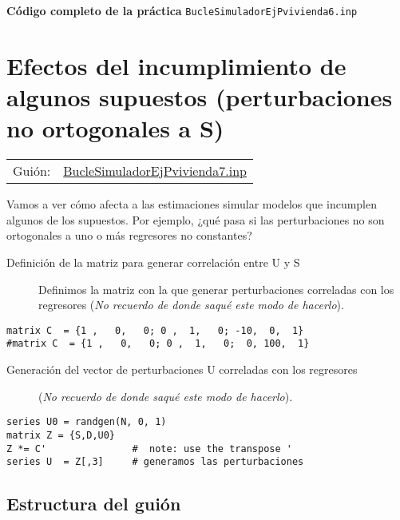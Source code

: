 \documentclass[11pt]{article}
\begin{document}
\noindent
\textbf{Código completo de la práctica} \texttt{BucleSimuladorEjPvivienda6.inp}
\vspace{10pt}

\clearpage



\section{Efectos del incumplimiento de algunos supuestos (perturbaciones no ortogonales a S)}
\label{sec:org3c49044}

\begin{center}
\begin{tabular}{ll}
Guión: & \href{https://github.com/mbujosab/Ectr/tree/master/Practicas/Gretl/scripts/BucleSimuladorEjPvivienda7.inp}{BucleSimuladorEjPvivienda7.inp}\\[0pt]
\end{tabular}
\end{center}

Vamos a ver cómo afecta a las estimaciones simular modelos que
incumplen algunos de los supuestos. Por ejemplo, ¿qué pasa si las
perturbaciones no son ortogonales a uno o más regresores no
constantes?

\begin{description}
\item[{Definición de la matriz para generar correlación entre U y S}] Definimos
la matriz con la que generar perturbaciones correladas con los
regresores (\emph{No recuerdo de donde saqué este modo de hacerlo}).
\end{description}
\begin{verbatim}
matrix C  = {1 ,   0,   0; 0 ,  1,   0; -10,  0,  1}
#matrix C  = {1 ,   0,   0; 0 ,  1,   0;  0, 100,  1}
\end{verbatim}


\begin{description}
\item[{Generación del vector de perturbaciones U correladas con los regresores}] (\emph{No
recuerdo de donde saqué este modo de hacerlo}).
\end{description}
\begin{verbatim}
series U0 = randgen(N, 0, 1)
matrix Z = {S,D,U0}
Z *= C'               #  note: use the transpose '
series U  = Z[,3]     # generamos las perturbaciones
\end{verbatim}


\subsection{Estructura del guión}
\label{sec:org64c0fcc}
\end{document}
